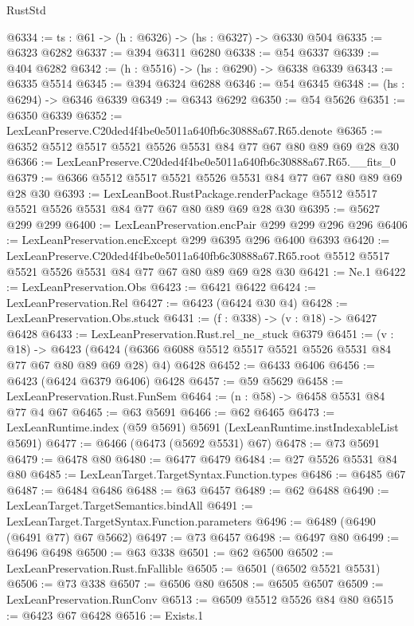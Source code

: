 \begin{lexlean}{RustStd}
\begin{coremodule}
@6334 := {ts : @61} -> (h : @6326) -> (hs : @6327) -> @6330 @504
@6335 := @6323 @6282
@6337 := @394 @6311 @6280
@6338 := @54 @6337
@6339 := @404 @6282
@6342 := (h : @5516) -> (hs : @6290) -> @6338 @6339
@6343 := @6335 @5514
@6345 := @394 @6324 @6288
@6346 := @54 @6345
@6348 := (hs : @6294) -> @6346 @6339
@6349 := @6343 @6292
@6350 := @54 @5626
@6351 := @6350 @6339
@6352 := LexLeanPreserve.C20ded4f4be0e5011a640fb6c30888a67.R65.denote
@6365 := @6352 @5512 @5517 @5521 @5526 @5531 @84 @77 @67 @80 @89 @69 @28 @30
@6366 := LexLeanPreserve.C20ded4f4be0e5011a640fb6c30888a67.R65.__fits_0
@6379 := @6366 @5512 @5517 @5521 @5526 @5531 @84 @77 @67 @80 @89 @69 @28 @30
@6393 := LexLeanBoot.RustPackage.renderPackage
    @5512
    @5517
    @5521
    @5526
    @5531
    @84
    @77
    @67
    @80
    @89
    @69
    @28
    @30
@6395 := @5627 @299 @299
@6400 := LexLeanPreservation.encPair @299 @299 @296 @296
@6406 := LexLeanPreservation.encExcept @299 @6395 @296 @6400 @6393
@6420 := LexLeanPreserve.C20ded4f4be0e5011a640fb6c30888a67.R65.root
    @5512
    @5517
    @5521
    @5526
    @5531
    @84
    @77
    @67
    @80
    @89
    @69
    @28
    @30
@6421 := Ne.{1}
@6422 := LexLeanPreservation.Obs
@6423 := @6421 @6422
@6424 := LexLeanPreservation.Rel
@6427 := @6423 (@6424 @30 @4)
@6428 := LexLeanPreservation.Obs.stuck
@6431 := (f : @338) -> (v : @18) -> @6427 @6428
@6433 := LexLeanPreservation.Rust.rel_ne_stuck @6379
@6451 := (v : @18) ->
  @6423 (@6424 (@6366 @6088 @5512 @5517 @5521 @5526 @5531 @84 @77 @67 @80 @89 @69 @28) @4) @6428
@6452 := @6433 @6406
@6456 := @6423 (@6424 @6379 @6406) @6428
@6457 := @59 @5629
@6458 := LexLeanPreservation.Rust.FunSem
@6464 := (n : @58) -> @6458 @5531 @84 @77 @4 @67
@6465 := @63 @5691
@6466 := @62 @6465
@6473 := LexLeanRuntime.index (@59 @5691) @5691 (LexLeanRuntime.instIndexableList @5691)
@6477 := @6466 (@6473 (@5692 @5531) @67)
@6478 := @73 @5691
@6479 := @6478 @80
@6480 := @6477 @6479
@6484 := @27 @5526 @5531 @84 @80
@6485 := LexLeanTarget.TargetSyntax.Function.types
@6486 := @6485 @67
@6487 := @6484 @6486
@6488 := @63 @6457
@6489 := @62 @6488
@6490 := LexLeanTarget.TargetSemantics.bindAll
@6491 := LexLeanTarget.TargetSyntax.Function.parameters
@6496 := @6489 (@6490 (@6491 @77) @67 @5662)
@6497 := @73 @6457
@6498 := @6497 @80
@6499 := @6496 @6498
@6500 := @63 @338
@6501 := @62 @6500
@6502 := LexLeanPreservation.Rust.fnFallible
@6505 := @6501 (@6502 @5521 @5531)
@6506 := @73 @338
@6507 := @6506 @80
@6508 := @6505 @6507
@6509 := LexLeanPreservation.RunConv
@6513 := @6509 @5512 @5526 @84 @80
@6515 := @6423 @67 @6428
@6516 := Exists.{1}

\end{coremodule}
\end{lexlean}
